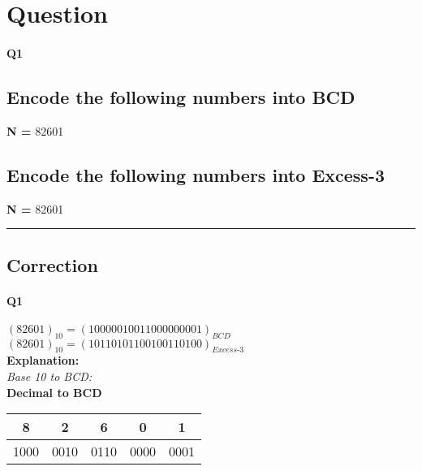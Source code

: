 
\section{Question}


\paragraph{Q1}





    \subsection*{Encode the following numbers into BCD}
    \textbf{N = } 82601
    \subsection*{Encode the following numbers into Excess-3}
    \textbf{N = } 82601











\hrule width 1\linewidth
\pagebreak

\subsection{Correction}


\paragraph{Q1}






$(82601)_{10} = (1000 0010 0110 0000 0001)_{BCD}$ \\[6pt]

$(82601)_{10} = (1011 0101 1001 0011 0100)_{Excess\text{-}3}$ \\[6pt]

\textbf{Explanation:} \\[6pt]

      \textit{Base 10 to BCD:} \\[6pt]
    
    \textbf{Decimal to BCD} \\

    \begin{tabular}{|c|c|c|c|c|}
    \hline
 8  &  2  &  6  &  0  &  1  \\
    \hline
 1000  &  0010  &  0110  &  0000  &  0001  \\
    \hline
    \end{tabular}



